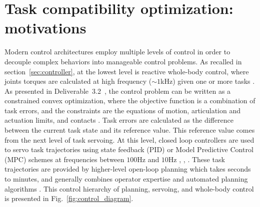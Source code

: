 \documentclass[12pt,a4paper,twoside]{article}
\begin{document}
\section{Task compatibility optimization: motivations}
\label{sec:introduction}


Modern control architectures employ multiple levels of control in order to decouple complex behaviors into manageable control problems. As recalled in section~\ref{sec:controller}, at the lowest level is reactive whole-body control, where joints torques are calculated at high frequency ($\sim1$kHz) given one or more tasks \cite{Khatib2004}. As presented in Deliverable~3.2~\cite{deliverable32}, the control problem can be written as a constrained convex optimization, where the objective function is a combination of task errors, and the constraints are the equations of motion, articulation and actuation limits, and contacts \cite{Salini2011, Saab2013, Bouyarmane2011}. Task errors are calculated as the difference between the current task state and its reference value. This reference value comes from the next level of task servoing. At this level, closed loop controllers are used to servo task trajectories using state feedback (PID) or Model Predictive Control (MPC) schemes at frequencies between $100$Hz and $10$Hz \underline{\bf \cite{Ibanez2014}}, \cite{Koenemann2015}, \underline{\bf \cite{Perrin2015}}. These task trajectories are provided by higher-level open-loop planning which takes seconds to minutes, and generally combines operator expertise and automated planning algorithms \cite{Bouyarmane2012, Pham2014}. This control hierarchy of planning, servoing, and whole-body control is presented in Fig.~\ref{fig:control_diagram}.\\
\end{document}
